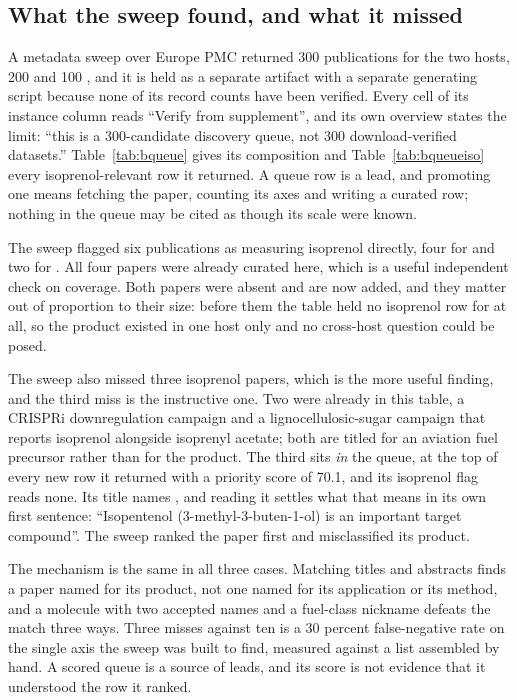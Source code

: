 \subsection{What the sweep found, and what it missed}\label{sec:sweep}

A metadata sweep over Europe PMC returned 300 publications for the two hosts, 200
 and 100 , and it is held as a separate artifact with a
separate generating script because none of its record counts have been verified. Every
cell of its instance column reads ``Verify from supplement'', and its own overview states
the limit: ``this is a 300-candidate discovery queue, not 300 download-verified
datasets.'' Table~\ref{tab:bqueue} gives its composition and Table~\ref{tab:bqueueiso}
every isoprenol-relevant row it returned. A queue row is a lead, and promoting one means
fetching the paper, counting its axes and writing a curated row; nothing in the queue may
be cited as though its scale were known.

The sweep flagged six publications as measuring isoprenol directly, four for
 and two for . All four  papers were already
curated here, which is a useful independent check on coverage. Both  papers
were absent and are now added, and they matter out of proportion to their size: before
them the table held no isoprenol row for  at all, so the product existed in
one host only and no cross-host question could be posed.

The sweep also missed three isoprenol papers, which is the more useful finding, and the
third miss is the instructive one. Two were already in this table, a CRISPRi
downregulation campaign and a lignocellulosic-sugar campaign that reports isoprenol
alongside isoprenyl acetate; both are titled for an aviation fuel precursor rather than
for the product. The third sits \emph{in} the queue, at the top of every new row it
returned with a priority score of 70.1, and its isoprenol flag reads none. Its title names
, and reading it settles what that means in its own first sentence:
``Isopentenol (3-methyl-3-buten-1-ol) is an important target compound''. The sweep ranked
the paper first and misclassified its product.

The mechanism is the same in all three cases. Matching titles and abstracts finds a paper
named for its product, not one named for its application or its method, and a molecule
with two accepted names and a fuel-class nickname defeats the match three ways. Three
misses against ten is a 30 percent false-negative rate on the single axis the sweep was
built to find, measured against a list assembled by hand. A scored queue is a source of
leads, and its score is not evidence that it understood the row it ranked.

